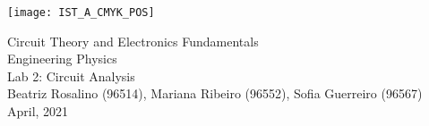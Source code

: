 
\thispagestyle {empty}

\texttt{[image: IST\_A\_CMYK\_POS]}

\begin{center}
%
\vspace{1.0cm}

\vspace{1cm}
{\FontLb Circuit Theory and Electronics Fundamentals} \\ %
\vspace{1cm}
{\FontSn Engineering Physics} \\ %
\vspace{1cm}
{\FontSn Lab 2: Circuit Analysis} \\
\vspace{1cm}
{\FontSn Beatriz Rosalino (96514), Mariana Ribeiro (96552), Sofia Guerreiro (96567)} \\
\vspace{1cm}
{ April, 2021} \\ %
%
\end{center}

